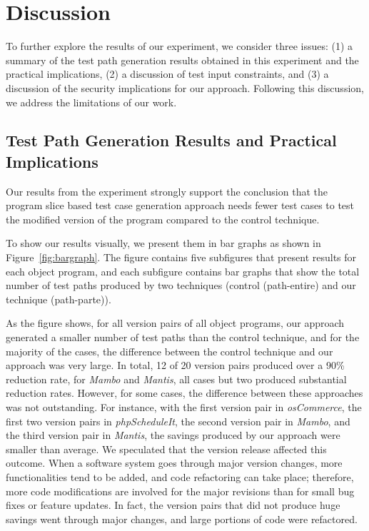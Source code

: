 \section{Discussion}
\label{sec:discussion}

To further explore the results of our
experiment, we consider three issues:
(1) a summary of the test path generation results
obtained in this experiment and the practical implications,
(2) a discussion of test input constraints, 
and (3) a discussion of the security implications for our approach.
Following this discussion, we address the limitations of our work. 

\subsection{Test Path Generation Results and Practical Implications}

Our results from the experiment strongly support the conclusion 
that the program slice based test case generation approach needs 
fewer test cases to test the modified version of the program 
compared to the control technique.

To show our results visually, we present them in bar graphs as shown
in Figure~\ref{fig:bargraph}. The figure contains five subfigures 
that present results for each object program, and each subfigure 
contains bar graphs that show the total number of test paths produced 
by two techniques (control (path-entire) and our technique (path-parte)).

As the figure shows, for all version pairs of all object programs, 
our approach generated a smaller number of test paths than the control 
technique, and for the majority of the cases, the difference between 
the control technique and our approach was very large. 
In total, 12 of 20 version pairs produced over a 90\% reduction rate, for
{\em Mambo} and {\em Mantis}, all cases but two produced substantial 
reduction rates. 
However, for some cases, the difference between these approaches was not 
outstanding. For instance, with the first version pair in {\em osCommerce}, 
the first two version pairs in {\em phpScheduleIt}, the second version pair 
in {\em Mambo}, and the third version pair in {\em Mantis}, 
the savings produced by our approach were smaller than average.
We speculated that the version release affected this outcome. 
When a software system goes through major version changes, 
more functionalities tend to be added, and code refactoring can take 
place; therefore, more code modifications are involved for the major revisions
than for small bug fixes or feature updates.
In fact, the version pairs that did not produce huge savings went through
major changes, and large portions of code were refactored.

